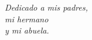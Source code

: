 
\cleardoublepage
\chapter*{}
\markboth{}{}
\thispagestyle{empty}
\begin{flushright}
\textit{Dedicado a mis padres,\\
mi hermano\\
y mi abuela.\\}
\end{flushright}